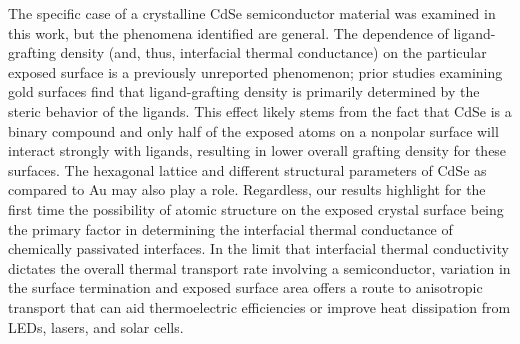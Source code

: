 The specific case of a crystalline CdSe semiconductor material was examined in this work, but the phenomena identified are general. The dependence of ligand-grafting density (and, thus, interfacial thermal conductance) on the particular exposed surface is a previously unreported phenomenon; prior studies examining gold surfaces find that ligand-grafting density is primarily determined by the steric behavior of the ligands. This effect likely stems from the fact that CdSe is a binary compound and only half of the exposed atoms on a nonpolar surface will interact strongly with ligands, resulting in lower overall grafting density for these surfaces. The hexagonal lattice and different structural parameters of CdSe as compared to Au may also play a role. Regardless, our results highlight for the first time the possibility of atomic structure on the exposed crystal surface being the primary factor in determining the interfacial thermal conductance of chemically passivated interfaces. In the limit that interfacial thermal conductivity dictates the overall thermal transport rate involving a semiconductor, variation in the surface termination and exposed surface area offers a route to anisotropic transport that can aid thermoelectric efficiencies or improve heat dissipation from LEDs, lasers, and solar cells.
